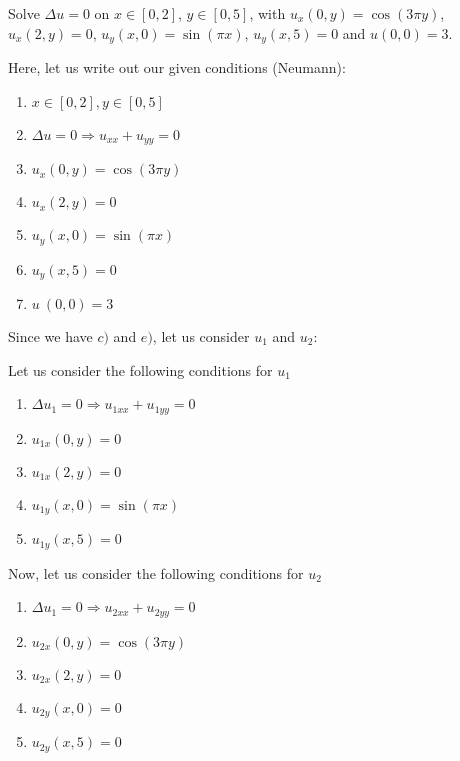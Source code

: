 \item Solve $\Delta u = 0$ on $x \in [0, 2]$, $y \in [0, 5]$, with $u_x(0, y) = \cos(3 \pi y)$, $u_x(2, y) = 0$, $u_y(x, 0) = \sin(\pi x)$, $u_y(x, 5) = 0$ and $u(0, 0) = 3$.

Here, let us write out our given conditions (Neumann):
\begin{enumerate}
  \item $x \in [0, 2], y \in [0, 5]$
  \item $\Delta u = 0 \Rightarrow u_{xx} + u_{yy} = 0$
  \item $u_x(0, y) = \cos(3 \pi y)$
  \item $u_x(2, y) = 0$
  \item $u_y(x, 0) = \sin(\pi x)$
  \item $u_y(x, 5) = 0$
  \item $u\ (0, 0) = 3$
\end{enumerate}

Since we have $c)$ and $e)$, let us consider $u_1$ and $u_2$:
%

\hrulefill

\begin{multicols}{2}
  Let us consider the following conditions for $u_1$
  \begin{enumerate}
    \item $\Delta u_1 = 0 \Rightarrow u_{1xx} + u_{1yy} = 0$
    \item $u_{1x}(0, y) = 0$
    \item $u_{1x}(2, y) = 0$
    \item $u_{1y}(x, 0) = \sin(\pi x)$
    \item $u_{1y}(x, 5) = 0$
  \end{enumerate}

  Now, let us consider the following conditions for $u_2$\\
  \begin{enumerate}
    \item $\Delta u_1 = 0 \Rightarrow u_{2xx} + u_{2yy} = 0$
    \item $u_{2x}(0, y) = \cos(3 \pi y)$
    \item $u_{2x}(2, y) = 0$
    \item $u_{2y}(x, 0) = 0$
    \item $u_{2y}(x, 5) = 0$
  \end{enumerate}
\end{multicols}
%
\hrulefill

